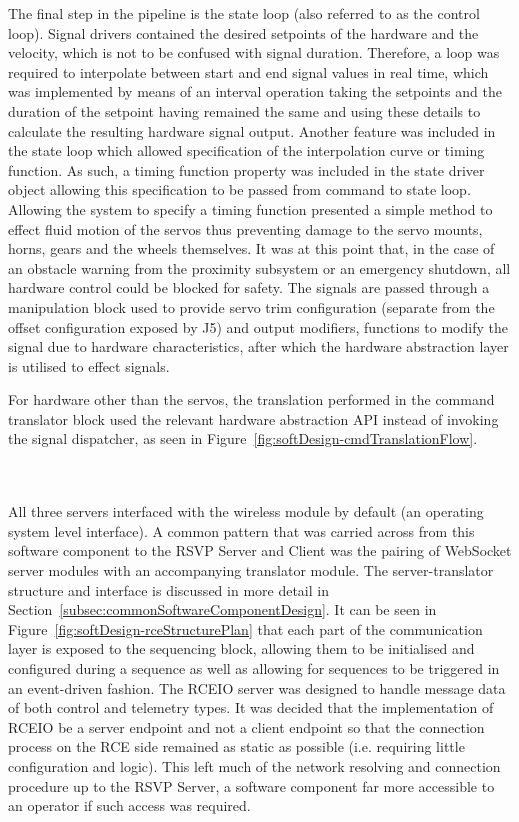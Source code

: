           The final step in the pipeline is the state loop (also referred to as the control loop). Signal drivers contained the desired setpoints of the hardware and the velocity, which is not to be confused with signal duration. Therefore, a loop was required to interpolate between start and end signal values in real time, which was implemented by means of an interval operation taking the setpoints and the duration of the setpoint having remained the same and using these details to calculate the resulting hardware signal output. Another feature was included in the state loop which allowed specification of the interpolation curve or timing function. As such, a timing function property was included in the state driver object allowing this specification to be passed from command to state loop. Allowing the system to specify a timing function presented a simple method to effect fluid motion of the servos thus preventing damage to the servo mounts, horns, gears and the wheels themselves. It was at this point that, in the case of an obstacle warning from the proximity subsystem or an emergency shutdown, all hardware control could be blocked for safety. The signals are passed through a manipulation block used to provide servo trim configuration (separate from the offset configuration exposed by J5) and output modifiers, functions to modify the signal due to hardware characteristics, after which the hardware abstraction layer is utilised to effect signals.
          
          For hardware other than the servos, the translation performed in the command translator block used the relevant hardware abstraction API instead of invoking the signal dispatcher, as seen in Figure~\ref{fig:softDesign-cmdTranslationFlow}.
          
         \\\\
           All three servers interfaced with the wireless module by default (an operating system level interface). A common pattern that was carried across from this software component to the RSVP Server and Client was the pairing of WebSocket server modules with an accompanying translator module. The server-translator structure and interface is discussed in more detail in Section~\ref{subsec:commonSoftwareComponentDesign}. It can be seen in Figure~\ref{fig:softDesign-rceStructurePlan} that each part of the communication layer is exposed to the sequencing block, allowing them to be initialised and configured during a sequence as well as allowing for sequences to be triggered in an event-driven fashion. The RCEIO server was designed to handle message data of both control and telemetry types. It was decided that the implementation of RCEIO be a server endpoint and not a client endpoint so that the connection process on the RCE side remained as static as possible (i.e. requiring little configuration and logic). This left much of the network resolving and connection procedure up to the RSVP Server, a software component far more accessible to an operator if such access was required.
           
